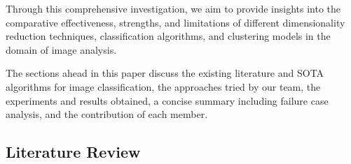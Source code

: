 \documentclass[a4paper]{article}
\theoremstyle{plain}
\theoremstyle{definition}
\begin{document}
\noindent Through this comprehensive investigation, we aim to provide insights into the comparative effectiveness, strengths, and limitations of different dimensionality reduction techniques, classification algorithms, and clustering models in the domain of image analysis. 
\newline

\noindent The sections ahead in this paper discuss the existing literature and SOTA algorithms for image classification, the approaches tried by our team, the experiments and results obtained, a concise summary including failure case analysis, and the contribution of each member.

\newpage
        
	
\subsection{Literature Review}
\end{document}
